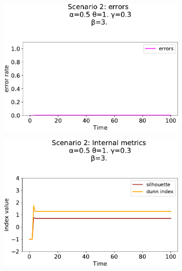 \begin{figure}[!ht]
\begin{subfigure}[b]{0.32\textwidth}
    \includegraphics[width=\textwidth]{papers/swarm-intelligence2021/img/simulations/stretched-errors_0_08_α-0.5_θ-1._γ-0.3_β-3._ω-0._ζ-0..pdf}
  \end{subfigure}
  \hfill
  \begin{subfigure}[b]{0.32\textwidth}
    \centering
    \includegraphics[width=\textwidth]{papers/swarm-intelligence2021/img/simulations/stretched-metrics_0_0910_α-0.5_θ-1._γ-0.3_β-3._ω-0._ζ-0..pdf}
  \end{subfigure}
  \\
  \begin{subfigure}[b]{0.32\textwidth}
    \centering

\end{subfigure}
\end{figure}
